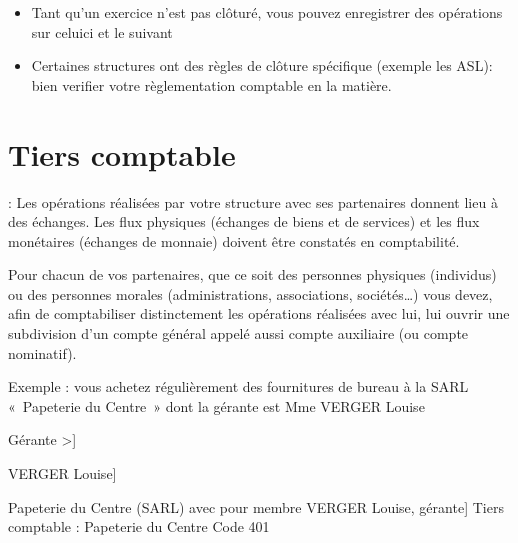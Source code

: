 \documentclass[a4paper,10pt,oneside,french]{sphinxmanual}
\begin{document}
\sphinxAtStartPar
{}
\begin{itemize}
\item {} 
\sphinxAtStartPar
Tant qu’un exercice n’est pas clôturé, vous pouvez enregistrer des opérations sur celui\sphinxhyphen{}ci et le suivant

\item {} 
\sphinxAtStartPar
Certaines structures ont des règles de clôture spécifique (exemple les ASL): bien verifier votre règlementation comptable en la matière.

\end{itemize}

\sphinxstepscope


\section{Tiers comptable}
\label{\detokenize{accounting/third:tiers-comptable}}\label{\detokenize{accounting/third::doc}}
\sphinxAtStartPar
{} :
Les opérations réalisées par votre structure avec ses partenaires donnent lieu à des échanges. Les flux physiques (échanges de biens et de services) et les flux monétaires (échanges de monnaie) doivent être constatés en comptabilité.

\sphinxAtStartPar
Pour chacun de vos partenaires, que ce soit des personnes physiques (individus) ou des personnes morales (administrations, associations, sociétés…) vous devez, afin de comptabiliser distinctement les opérations réalisées avec lui, lui ouvrir une subdivision d’un compte général appelé aussi compte auxiliaire (ou compte nominatif).

\sphinxAtStartPar
Exemple : vous achetez régulièrement des fournitures de bureau à la SARL « Papeterie du Centre » dont la gérante est Mme VERGER Louise
\begin{description}
\begin{description}
\sphinxlineitem{Fonction}{[}Gérante                                  \textendash{}\textgreater{}{]}\begin{description}
\sphinxlineitem{Personne physique}{[}VERGER Louise{]}\begin{description}
\sphinxlineitem{Personne morale}{[}Papeterie du Centre (SARL) avec pour membre VERGER Louise, gérante{]}
\sphinxAtStartPar
Tiers comptable : Papeterie du Centre \sphinxhyphen{} Code 401

\end{description}

\end{description}

\end{description}

\end{description}
\end{document}
